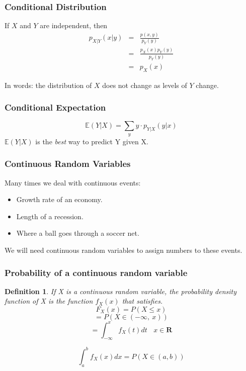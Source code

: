 \documentclass{beamer}
\newtheorem{defn}{Definition}
\numberwithin{equation}{section}
\begin{document}
\begin{frame}
\frametitle{Conditional Distribution}

If $X$ and $Y$ are independent, then 
\begin{eqnarray}
p_{X|Y} (x|y) & = & \frac{p(x,y)}{p_{Y}(y)} \nonumber \\
& = & \frac{p_{X}(x)p_{Y}(y)}{p_{Y}(y) }\nonumber \\
& = & p_{X}(x) \nonumber 
\end{eqnarray}

In words: the distribution of $X$ does not change as levels of $Y$ change.  

\end{frame}

\begin{frame}
\frametitle{Conditional Expectation}
$$\mathbb{E}(Y|X)=\sum_y y\cdot p_{Y|X} (y|x) $$
$\mathbb{E}(Y|X)$ is the \emph{best} way to predict Y given X.

\end{frame}









\begin{frame}
\frametitle{Continuous Random Variables}
Many times we deal with continuous events:
\begin{itemize}
\item Growth rate of an economy.\pause
\item Length of a recession.\pause
\item Where a ball goes through a soccer net.
\end{itemize}
\pause
We will need continuous random variables to assign numbers to these events.
\end{frame}




\begin{frame}
\frametitle{Probability of a continuous random variable}

\begin{defn}
If X is a continuous random variable, the probability density function of X is the function $f_X(x)$ that satisfies.
$$F_X(x)=P(X\leq x)$$\pause
$$=P(X\in (-\infty,\ x))$$
$$=\int_{-\infty}^{x} f_X(t)dt\ \ \ \ x\in \textbf{R}$$
\end{defn}
\pause
$$\int_a^b f_X(x)dx=P(X\in(a,b))$$
\end{frame}
\end{document}
